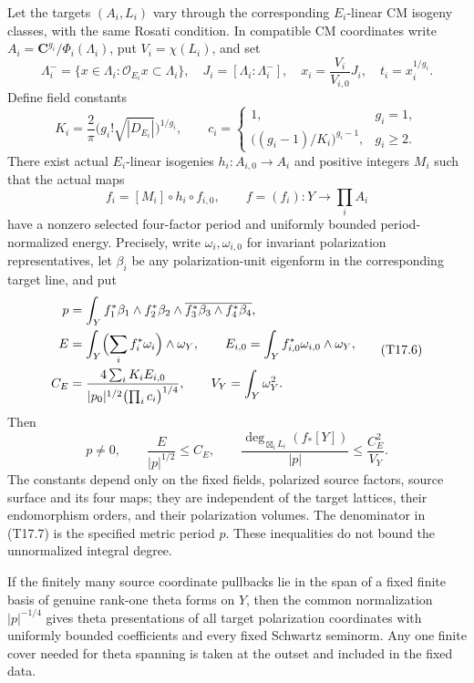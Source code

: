 Let the targets \((A_i,L_i)\) vary through the corresponding \(E_i\)-linear CM isogeny classes, with the same Rosati condition. In compatible CM coordinates write \(A_i=\mathbf C^{g_i}/\Phi_i(\Lambda_i)\), put \(V_i=\chi(L_i)\), and set \[
\Lambda_i^- =\{x\in\Lambda_i:\mathcal O_{E_i}x\subset\Lambda_i\},\quad
J_i=[\Lambda_i:\Lambda_i^-],\quad
x_i=\frac{V_i}{V_{i,0}}J_i,\quad t_i=x_i^{1/g_i}.
\tag{T17.3}
\] Define field constants \[
K_i=\frac2\pi\bigl(g_i!\sqrt{|D_{E_i}|}\bigr)^{1/g_i},\qquad
c_i=
\begin{cases}
1,&g_i=1,\\
\bigl((g_i-1)/K_i\bigr)^{g_i-1},&g_i\ge2.
\end{cases}
\tag{T17.4}
\] There exist actual \(E_i\)-linear isogenies \(h_i:A_{i,0}\to A_i\) and positive integers \(M_i\) such that the actual maps \[
f_i=[M_i]\circ h_i\circ f_{i,0},\qquad f=(f_i):Y\to\prod_iA_i
\tag{T17.5}
\] have a nonzero selected four-factor period and uniformly bounded period-normalized energy. Precisely, write \(\omega_i,\omega_{i,0}\) for invariant polarization representatives, let \(\beta_i\) be any polarization-unit eigenform in the corresponding target line, and put \[
\begin{aligned}
p&=\int_Yf_1^*\beta_1\wedge f_2^*\beta_2
                   \wedge\overline{f_3^*\beta_3\wedge f_4^*\beta_4},\\
E&=\int_Y\Bigl(\sum_i f_i^*\omega_i\Bigr)\wedge\omega_Y,\qquad
E_{i,0}=\int_Y f_{i,0}^*\omega_{i,0}\wedge\omega_Y,\\
C_E&=\frac{4\sum_iK_iE_{i,0}}
               {|p_0|^{1/2}\bigl(\prod_i c_i\bigr)^{1/4}},\qquad
V_Y=\int_Y\omega_Y^2.
\end{aligned}
\tag{T17.6}
\] Then \[
p\ne0,\qquad \frac{E}{|p|^{1/2}}\le C_E,
\qquad
\frac{\deg_{\boxtimes_iL_i}(f_*[Y])}{|p|}
\le\frac{C_E^2}{V_Y}.
\tag{T17.7}
\] The constants depend only on the fixed fields, polarized source factors, source surface and its four maps; they are independent of the target lattices, their endomorphism orders, and their polarization volumes. The denominator in (T17.7) is the specified metric period \(p\). These inequalities do not bound the unnormalized integral degree.

If the finitely many source coordinate pullbacks lie in the span of a fixed finite basis of genuine rank-one theta forms on \(Y\), then the common normalization \(|p|^{-1/4}\) gives theta presentations of all target polarization coordinates with uniformly bounded coefficients and every fixed Schwartz seminorm. Any one finite cover needed for theta spanning is taken at the outset and included in the fixed data.

